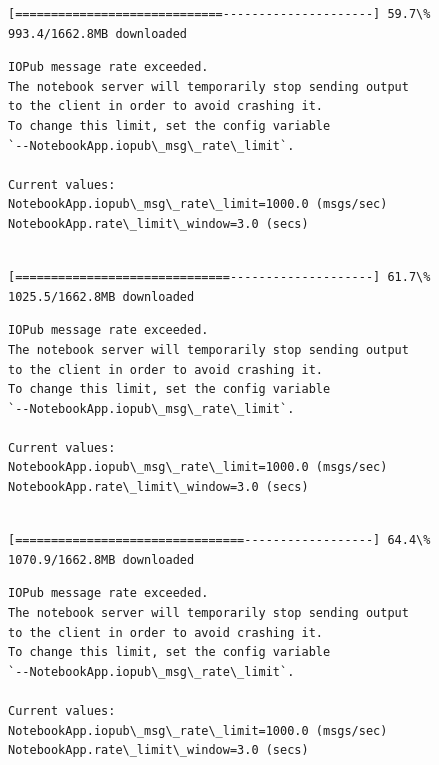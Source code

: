 \documentclass[11pt]{article}
\begin{document}
    \begin{Verbatim}[commandchars=\\\{\}]
[=============================---------------------] 59.7\% 993.4/1662.8MB downloaded
    \end{Verbatim}

    \begin{Verbatim}[commandchars=\\\{\}]
IOPub message rate exceeded.
The notebook server will temporarily stop sending output
to the client in order to avoid crashing it.
To change this limit, set the config variable
`--NotebookApp.iopub\_msg\_rate\_limit`.

Current values:
NotebookApp.iopub\_msg\_rate\_limit=1000.0 (msgs/sec)
NotebookApp.rate\_limit\_window=3.0 (secs)


    \end{Verbatim}

    \begin{Verbatim}[commandchars=\\\{\}]
[==============================--------------------] 61.7\% 1025.5/1662.8MB downloaded
    \end{Verbatim}

    \begin{Verbatim}[commandchars=\\\{\}]
IOPub message rate exceeded.
The notebook server will temporarily stop sending output
to the client in order to avoid crashing it.
To change this limit, set the config variable
`--NotebookApp.iopub\_msg\_rate\_limit`.

Current values:
NotebookApp.iopub\_msg\_rate\_limit=1000.0 (msgs/sec)
NotebookApp.rate\_limit\_window=3.0 (secs)


    \end{Verbatim}

    \begin{Verbatim}[commandchars=\\\{\}]
[================================------------------] 64.4\% 1070.9/1662.8MB downloaded
    \end{Verbatim}

    \begin{Verbatim}[commandchars=\\\{\}]
IOPub message rate exceeded.
The notebook server will temporarily stop sending output
to the client in order to avoid crashing it.
To change this limit, set the config variable
`--NotebookApp.iopub\_msg\_rate\_limit`.

Current values:
NotebookApp.iopub\_msg\_rate\_limit=1000.0 (msgs/sec)
NotebookApp.rate\_limit\_window=3.0 (secs)


    \end{Verbatim}
\end{document}
